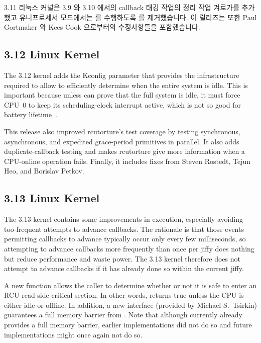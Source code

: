3.11 리눅스 커널은 3.9 와 3.10 에서의 callback 태깅 작업의 정리 작업 겨로가를
추가했고 유니프로세서 모드에서는  를 수행하도록
 를 제거했습니다.
이 릴리즈는 또한 Paul Gortmaker 와 Kees Cook 으로부터의 수정사항들을
포함했습니다.

\subsection{3.12 Linux Kernel}

The 3.12 kernel adds the  Kconfig
parameter that provides the infrastructure required to allow
 to efficiently determine when the entire
system is idle.
This is important because unless  can prove
that the full system is idle, it must force CPU~0 to keep its
scheduling-clock interrupt active, which is not so good for battery
lifetime~\cite{JonathanCorbet2013SYSIDLE}.

This release also improved rcutorture's test coverage by testing
synchronous, asynchronous, and expedited grace-period primitives
in parallel.
It also adds duplicate-callback testing and makes rcutorture give
more information when a CPU-online operation fails.
Finally, it includes fixes from Steven Rostedt, Tejun Heo, and Borislav
Petkov.

\subsection{3.13 Linux Kernel}

The 3.13 kernel contains some improvements in 
execution, especially avoiding too-frequent attempts to advance callbacks.
The rationale is that those events permitting callbacks to advance
typically occur only every few milliseconds, so attempting to advance callbacks
more frequently than once per jiffy does nothing but reduce performance and
waste power.
The 3.13 kernel therefore does not attempt to advance callbacks if it
has already done so within the current jiffy.

A new  function allows the caller to determine
whether or not it is safe to enter an RCU read-side critical section.
In other words,  returns true unless the CPU is
either idle or offline.
In addition, a new 
interface (provided by Michael S.~Tsirkin)
guarantees a full memory barrier from .
Note that although  currently already provides
a full memory barrier, earlier implementations did not do so and
future implementations might once again not do so.

